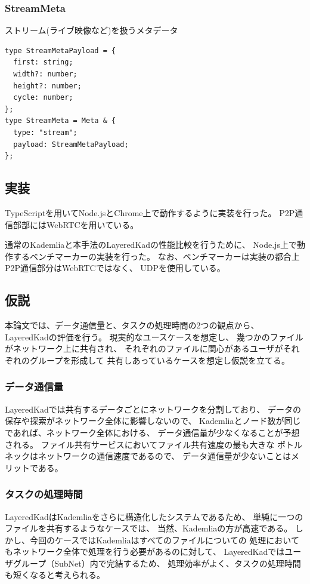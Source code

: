 \documentclass[sotsuron]{jcsie}
\begin{document}
\subsubsection{StreamMeta}
ストリーム(ライブ映像など)を扱うメタデータ
\begin{lstlisting}
type StreamMetaPayload = {
  first: string;
  width?: number;
  height?: number;
  cycle: number;
};	
type StreamMeta = Meta & {
  type: "stream";
  payload: StreamMetaPayload;
};  
\end{lstlisting}

\subsection{実装}
TypeScriptを用いてNode.jsとChrome上で動作するように実装を行った。
P2P通信部部にはWebRTCを用いている。

通常のKademliaと本手法のLayeredKadの性能比較を行うために、
Node.js上で動作するベンチマーカーの実装を行った。
なお、ベンチマーカーは実装の都合上P2P通信部分はWebRTCではなく、
UDPを使用している。

\subsection{仮説}
本論文では、データ通信量と、タスクの処理時間の2つの観点から、
LayeredKadの評価を行う。
現実的なユースケースを想定し、
幾つかのファイルがネットワーク上に共有され、
それぞれのファイルに関心があるユーザがそれぞれのグループを形成して
共有しあっているケースを想定し仮説を立てる。
\subsubsection{データ通信量}
LayeredKadでは共有するデータごとにネットワークを分割しており、
データの保存や探索がネットワーク全体に影響しないので、
Kademliaとノード数が同じであれば、ネットワーク全体における、
データ通信量が少なくなることが予想される。
ファイル共有サービスにおいてファイル共有速度の最も大きな
ボトルネックはネットワークの通信速度であるので、
データ通信量が少ないことはメリットである。
\subsubsection{タスクの処理時間}
LayeredKadはKademliaをさらに構造化したシステムであるため、
単純に一つのファイルを共有するようなケースでは、
当然、Kademliaの方が高速である。
しかし、今回のケースではKademliaはすべてのファイルについての
処理においてもネットワーク全体で処理を行う必要があるのに対して、
LayeredKadではユーザグループ（SubNet）内で完結するため、
処理効率がよく、タスクの処理時間も短くなると考えられる。
\end{document}
